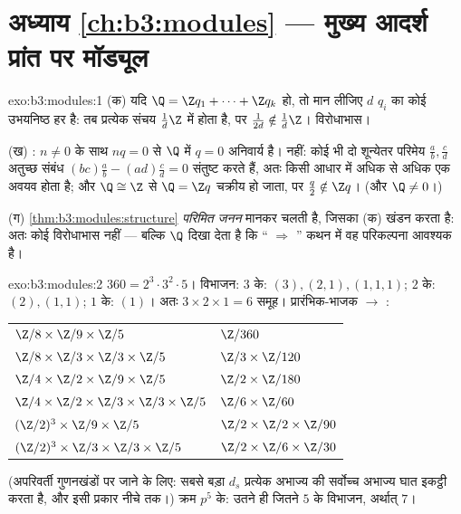 \section*{अध्याय \ref{ch:b3:modules} --- मुख्य आदर्श प्रांत पर
मॉड्यूल}

\begin{solution}{exo:b3:modules:1}
(क) यदि $\Q = \Z q_1 + \dots + \Z q_k$ हो, तो मान लीजिए $d$ $q_i$ का कोई उभयनिष्ठ हर है: तब
प्रत्येक संचय $\frac1d\Z$ में होता है, पर $\frac1{2d} \notin \frac1d\Z$। विरोधाभास।

(ख) : $n \neq 0$ के साथ $nq = 0$ से $\Q$ में $q = 0$ अनिवार्य है। 
नहीं: कोई भी दो शून्येतर परिमेय $\frac ab, \frac cd$ अतुच्छ संबंध $(bc)\frac ab - (ad)\frac cd =
0$ संतुष्ट करते
हैं, अतः किसी आधार में अधिक से अधिक एक अवयव होता है; और $\Q \cong \Z$ से
$\Q = \Z q$ चक्रीय हो जाता, पर $\frac q2 \notin \Z q$। (और $\Q \neq
0$।)

(ग) \cref{thm:b3:modules:structure} \emph{परिमित जनन} मानकर चलती है, जिसका (क) खंडन करता है:
अतः कोई विरोधाभास नहीं --- बल्कि $\Q$ दिखा देता है कि ``
$\Rightarrow$ '' कथन में वह परिकल्पना आवश्यक है।
\end{solution}

\begin{solution}{exo:b3:modules:2}
$360 = 2^3\cdot3^2\cdot5$। विभाजन: $3$ के: $(3), (2,1),
(1,1,1)$; $2$ के: $(2), (1,1)$; $1$ के: $(1)$। अतः
$3 \times 2
\times 1 = 6$ समूह। प्रारंभिक-भाजक $\to$ :
\begin{center}
\begin{tabular}{l l}
$\Z/8 \times \Z/9 \times \Z/5$ & $\Z/360$\\
$\Z/8 \times \Z/3 \times \Z/3 \times \Z/5$ & $\Z/3 \times
\Z/120$\\
$\Z/4 \times \Z/2 \times \Z/9 \times \Z/5$ & $\Z/2 \times
\Z/180$\\
$\Z/4 \times \Z/2 \times \Z/3 \times \Z/3 \times \Z/5$ & $\Z/6
\times \Z/60$\\
$(\Z/2)^3 \times \Z/9 \times \Z/5$ & $\Z/2 \times \Z/2 \times
\Z/90$\\
$(\Z/2)^3 \times \Z/3 \times \Z/3 \times \Z/5$ & $\Z/2 \times
\Z/6 \times \Z/30$
\end{tabular}
\end{center}
(अपरिवर्ती गुणनखंडों पर जाने के लिए: सबसे बड़ा $d_s$ प्रत्येक अभाज्य
की सर्वोच्च अभाज्य घात इकट्ठी करता है, और इसी प्रकार नीचे तक।) क्रम
$p^5$ के: उतने ही जितने $5$ के विभाजन, अर्थात् $7$।
\end{solution}

